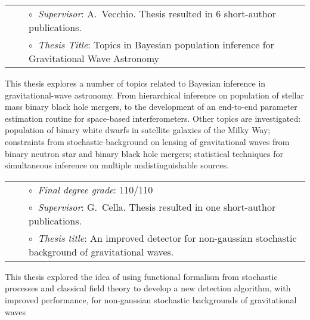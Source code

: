 \vspace{-0.1cm}
\begin{tabular}{rcl}
&\hspace{0.4cm} &$\circ\;\;${\textit{Supervisor}}: A.~Vecchio. Thesis resulted in 6 short-author publications.
\\
&\hspace{0.4cm} &$\circ\;\;${\textit{Thesis Title}}:
Topics in Bayesian population inference for Gravitational Wave Astronomy
\end{tabular}
\vspace{0.2cm}

This thesis explores a number of topics related to Bayesian inference in gravitational-wave astronomy. From hierarchical inference on population of stellar mass binary black hole mergers, to the development of an end-to-end parameter estimation routine for space-based interferometers. Other topics are investigated: population of binary white dwarfs in satellite galaxies of the Milky Way; constraints from stochastic background on lensing of gravitational waves from binary neutron star and binary black hole mergers; statistical techniques for simultaneous inference on multiple undistinguishable sources.

\vspace{0.2cm}
\vspace{-0.1cm}
\begin{tabular}{rcl}
&\hspace{0.4cm} &$\circ\;\;${\textit{Final degree grade}}: 110/110\\
&\hspace{0.4cm} &$\circ\;\;${\textit{Supervisor}}: G.~Cella. Thesis resulted in one short-author publications.\\
&\hspace{0.4cm} &$\circ\;\;${\textit{Thesis title}}: An improved detector for non-gaussian stochastic background of gravitational waves.
\end{tabular}
\vspace{0.2cm}

This thesis explored the idea of using functional formalism from stochastic processes and classical field theory to develop a new detection algorithm, with improved performance, for non-gaussian stochastic backgrounds of gravitational waves

